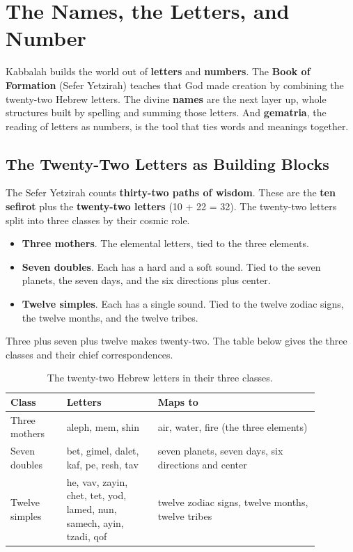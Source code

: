 \section{The Names, the Letters, and Number}

Kabbalah builds the world out of \textbf{letters} and \textbf{numbers}. The
\textbf{Book of Formation} (Sefer Yetzirah) teaches that God made creation by
combining the twenty-two Hebrew letters. The divine \textbf{names} are the next
layer up, whole structures built by spelling and summing those letters. And
\textbf{gematria}, the reading of letters as numbers, is the tool that ties words
and meanings together.

\subsection{The Twenty-Two Letters as Building Blocks}

The Sefer Yetzirah counts \textbf{thirty-two paths of wisdom}. These are the
\textbf{ten sefirot} plus the \textbf{twenty-two letters} (10 + 22 = 32). The
twenty-two letters split into three classes by their cosmic role.

\begin{itemize}
 \item \textbf{Three mothers}. The elemental letters, tied to the three
 elements.
 \item \textbf{Seven doubles}. Each has a hard and a soft sound. Tied to the
 seven planets, the seven days, and the six directions plus center.
 \item \textbf{Twelve simples}. Each has a single sound. Tied to the twelve
 zodiac signs, the twelve months, and the twelve tribes.
\end{itemize}

Three plus seven plus twelve makes twenty-two. The table below gives the three
classes and their chief correspondences.

\begin{longtable}{L{0.16\linewidth} L{0.26\linewidth} L{0.46\linewidth}}
\caption{The twenty-two Hebrew letters in their three classes.}\\
\toprule
\textbf{Class} & \textbf{Letters} & \textbf{Maps to} \\
\midrule
Three mothers & aleph, mem, shin & air, water, fire (the three elements) \\
Seven doubles & bet, gimel, dalet, kaf, pe, resh, tav & seven planets, seven days, six directions and center \\
Twelve simples & he, vav, zayin, chet, tet, yod, lamed, nun, samech, ayin, tzadi, qof & twelve zodiac signs, twelve months, twelve tribes \\
\bottomrule
\end{longtable}

